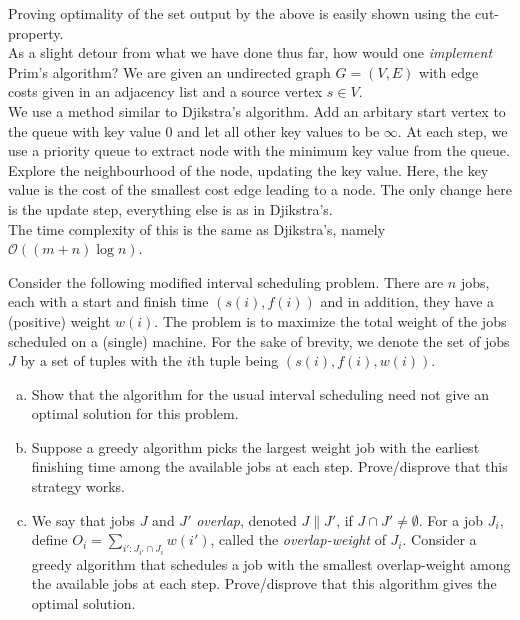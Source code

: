 Proving optimality of the set output by the above is easily shown using the cut-property.\\

As a slight detour from what we have done thus far, how would one \textit{implement} Prim's algorithm? We are given an undirected graph $G=(V,E)$ with edge costs given in an adjacency list and a source vertex $s\in V$.\\
We use a method similar to Djikstra's algorithm. Add an arbitary start vertex to the queue with key value $0$ and let all other key values to be $\infty$. At each step, we use a priority queue to extract node with the minimum key value from the queue. Explore the neighbourhood of the node, updating the key value. Here, the key value is the cost of the smallest cost edge leading to a node. The only change here is the update step, everything else is as in Djikstra's.\\
The time complexity of this is the same as Djikstra's, namely $\mathcal{O}((m+n)\log n)$.

\begin{exercise}
	Consider the following modified interval scheduling problem. There are $n$ jobs, each with a start and finish time $(s(i),f(i))$ and in addition, they have a (positive) weight $w(i)$. The problem is to maximize the total weight of the jobs scheduled on a (single) machine. For the sake of brevity, we denote the set of jobs $J$ by a set of tuples with the $i$th tuple being $(s(i),f(i),w(i))$.
	\begin{enumerate}[(a)]
		\item Show that the algorithm for the usual interval scheduling need not give an optimal solution for this problem.
		
		\item Suppose a greedy algorithm picks the largest weight job with the earliest finishing time among the available jobs at each step. Prove/disprove that this strategy works.
		
		\item We say that jobs $J$ and $J'$ \textit{overlap}, denoted $J\| J'$, if $J\cap J'\neq\emptyset$. For a job $J_i$, define $O_i = \sum_{i':J_{i'}\cap J_i} w(i')$, called the \textit{overlap-weight} of $J_i$. Consider a greedy algorithm that schedules a job with the smallest overlap-weight among the available jobs at each step. Prove/disprove that this algorithm gives the optimal solution.
	\end{enumerate}
\end{exercise}

